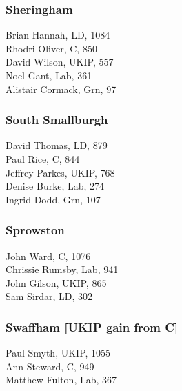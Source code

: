 \documentclass[a4paper,openany,10pt]{book}
\begin{document}
\subsubsection*{Sheringham}



Brian Hannah, LD, 1084\\
Rhodri Oliver, C, 850\\
David Wilson, UKIP, 557\\
Noel Gant, Lab, 361\\
Alistair Cormack, Grn, 97\\


\subsubsection*{South Smallburgh}



David Thomas, LD, 879\\
Paul Rice, C, 844\\
Jeffrey Parkes, UKIP, 768\\
Denise Burke, Lab, 274\\
Ingrid Dodd, Grn, 107\\


\subsubsection*{Sprowston}



John Ward, C, 1076\\
Chrissie Rumsby, Lab, 941\\
John Gilson, UKIP, 865\\
Sam Sirdar, LD, 302\\


\subsubsection*{Swaffham \hspace*{\fill}\nolinebreak[1]%
\enspace\hspace*{\fill}
[UKIP gain from C]}



Paul Smyth, UKIP, 1055\\
Ann Steward, C, 949\\
Matthew Fulton, Lab, 367\\
\end{document}

